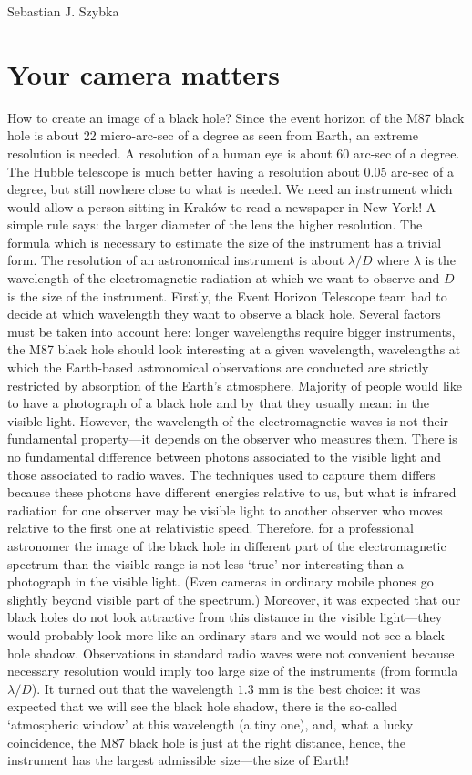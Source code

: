 \begin{artengenv}{Sebastian J. Szybka}
\section{Your camera matters}

How to create an image of a black hole? Since the event horizon of the M87 black hole is about 22 micro-arc-sec of a degree as seen from Earth, an extreme resolution is needed. A resolution of a human eye is about 60 arc-sec of a degree. The Hubble telescope is much better having a resolution about 0.05 arc-sec of a degree, but still nowhere close to what is needed. We need an instrument which would allow a person sitting in Kraków to read a newspaper in New York! A simple rule says: the larger diameter of the lens the higher resolution. The formula which is necessary to estimate the size of the instrument has a trivial form. The resolution of an astronomical instrument is about $\lambda/D$ where $\lambda$ is the wavelength of the electromagnetic radiation at which we want to observe and $D$ is the size of the instrument. Firstly, the Event Horizon Telescope team had to decide at which wavelength they want to observe a black hole. Several factors must be taken into account here: longer wavelengths require bigger instruments, the M87 black hole should look interesting at a given wavelength, wavelengths at which the Earth-based astronomical observations are conducted are strictly restricted by absorption of the Earth's atmosphere. Majority of people would like to have a photograph of a black hole and by that they usually mean: in the visible light. However, the wavelength of the electromagnetic waves is not their fundamental property---it depends on the observer who measures them. There is no fundamental difference between photons associated to the visible light and those associated to radio waves. The techniques used to capture them differs because these photons have different energies relative to us, but what is infrared radiation for one observer may be visible light to another observer who moves relative to the first one at relativistic speed. Therefore, for a professional astronomer the image of the black hole in different part of the electromagnetic spectrum than the visible range is not less `true' nor interesting than a photograph in the visible light. (Even cameras in ordinary mobile phones go slightly beyond visible part of the spectrum.) Moreover, it was expected that our black holes do not look attractive from this distance in the visible light---they would probably look more like an ordinary stars and we would not see a black hole shadow. Observations in standard radio waves were not convenient because necessary resolution would imply too large size of the instruments (from formula $\lambda/D$). It turned out that the wavelength $1.3$ mm is the best choice: it was expected that we will see the black hole shadow, there is the so-called `atmospheric window' at this wavelength (a tiny one), and, what a lucky coincidence, the M87 black hole is just at the right distance, hence, the instrument has the largest admissible size---the size of Earth!


\end{artengenv}

